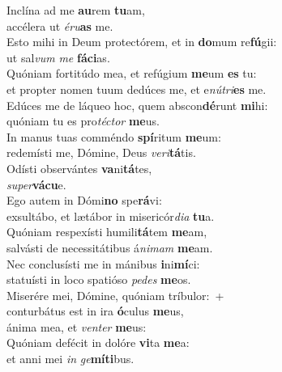 \evenverse Inclína ad me \textbf{au}rem \textbf{tu}am,~\*\\
\evenverse accélera ut \textit{é}\textit{ru}\textbf{as} me.\\
\oddverse Esto mihi in Deum protectórem, et in \textbf{do}mum re\textbf{fú}gii:~\*\\
\oddverse ut sal\textit{vum} \textit{me} \textbf{fá}\textbf{ci}as.\\
\evenverse Quóniam fortitúdo mea, et refúgium \textbf{me}um \textbf{es} tu:~\*\\
\evenverse et propter nomen tuum dedúces me, et e\textit{nú}\textit{tri}\textbf{es} me.\\
\oddverse Edúces me de láqueo hoc, quem abscon\textbf{dé}runt \textbf{mi}hi:~\*\\
\oddverse quóniam tu es pro\textit{té}\textit{ctor} \textbf{me}us.\\
\evenverse In manus tuas comméndo \textbf{spí}ritum \textbf{me}um:~\*\\
\evenverse redemísti me, Dómine, Deus \textit{ve}\textit{ri}\textbf{tá}tis.\\
\oddverse Odísti observántes \textbf{va}ni\textbf{tá}tes,~\*\\
\oddverse \textit{su}\textit{per}\textbf{vá}\textbf{cu}e.\\
\evenverse Ego autem in Dómi\textbf{no} spe\textbf{rá}vi:~\*\\
\evenverse exsultábo, et lætábor in misericór\textit{di}\textit{a} \textbf{tu}a.\\
\oddverse Quóniam respexísti humili\textbf{tá}tem \textbf{me}am,~\*\\
\oddverse salvásti de necessitátibus á\textit{ni}\textit{mam} \textbf{me}am.\\
\evenverse Nec conclusísti me in mánibus \textbf{i}ni\textbf{mí}ci:~\*\\
\evenverse statuísti in loco spatióso \textit{pe}\textit{des} \textbf{me}os.\\
\oddverse Miserére mei, Dómine, quóniam tríbulor:~+\\
\oddverse  conturbátus est in ira \textbf{ó}culus \textbf{me}us,~\*\\
\oddverse ánima mea, et \textit{ven}\textit{ter} \textbf{me}us:\\
\evenverse Quóniam defécit in dolóre \textbf{vi}ta \textbf{me}a:~\*\\
\evenverse et anni mei \textit{in} \textit{ge}\textbf{mí}\textbf{ti}bus.\\
